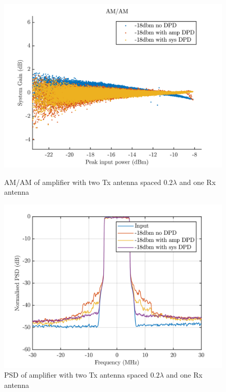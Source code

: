 \begin{figure}[H]
  \centering
  \begin{minipage}[b]{0.5\textwidth}
	\includegraphics[scale = 0.5]{figures/measurement/cree/two/amam_two_ant_0p2.png}
	\caption{AM/AM of amplifier with two Tx antenna spaced $0.2\lambda$ and one Rx antenna}
    \label{fig:cree_amam_two_ant1}
  \end{minipage}
  \hfill
  \begin{minipage}[b]{0.4\textwidth}
\includegraphics[scale = 0.5]{figures/measurement/cree/two/psd_two_ant_0p2.png}
\caption{PSD of amplifier with two Tx antenna spaced $0.2\lambda$ and one Rx antenna}
    \label{fig:cree_psd_two_ant1}
  \end{minipage}
\end{figure}

